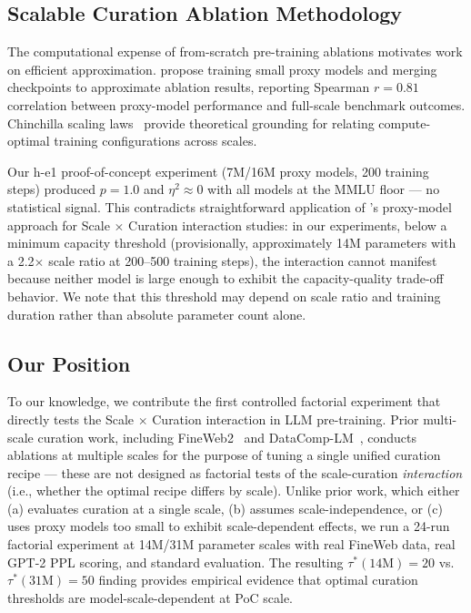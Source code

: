 \subsection{Scalable Curation Ablation Methodology}

The computational expense of from-scratch pre-training ablations motivates work on efficient approximation. \citet{Na2024Scalable} propose training small proxy models and merging checkpoints to approximate ablation results, reporting Spearman $r{=}0.81$ correlation between proxy-model performance and full-scale benchmark outcomes. Chinchilla scaling laws~\cite{Hoffmann2022Training} provide theoretical grounding for relating compute-optimal training configurations across scales.

Our h-e1 proof-of-concept experiment (7M/16M proxy models, 200 training steps) produced $p{=}1.0$ and $\eta^2{\approx}0$ with all models at the MMLU floor --- no statistical signal. This contradicts straightforward application of \citeauthor{Na2024Scalable}'s proxy-model approach for Scale $\times$ Curation interaction studies: in our experiments, below a minimum capacity threshold (provisionally, approximately 14M parameters with a 2.2$\times$ scale ratio at 200--500 training steps), the interaction cannot manifest because neither model is large enough to exhibit the capacity-quality trade-off behavior. We note that this threshold may depend on scale ratio and training duration rather than absolute parameter count alone.

\subsection{Our Position}

To our knowledge, we contribute the first controlled factorial experiment that directly tests the Scale $\times$ Curation interaction in LLM pre-training. Prior multi-scale curation work, including FineWeb2~\cite{Penedo2025FineWeb2} and DataComp-LM~\cite{Gururangan2024DataComp}, conducts ablations at multiple scales for the purpose of tuning a single unified curation recipe --- these are not designed as factorial tests of the scale-curation \emph{interaction} (i.e., whether the optimal recipe differs by scale). Unlike prior work, which either (a) evaluates curation at a single scale, (b) assumes scale-independence, or (c) uses proxy models too small to exhibit scale-dependent effects, we run a 24-run factorial experiment at 14M/31M parameter scales with real FineWeb data, real GPT-2 PPL scoring, and standard evaluation. The resulting $\tau^*(14\text{M}){=}20$ vs.\ $\tau^*(31\text{M}){=}50$ finding provides empirical evidence that optimal curation thresholds are model-scale-dependent at PoC scale.
